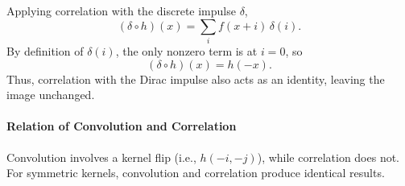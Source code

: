 Applying correlation with the discrete impulse \(\delta\),
\[
(\delta \circ h)(x) = \sum_{i} f(x+i) \, \delta(i).
\]
By definition of \(\delta(i)\), the only nonzero term is at \(i = 0\), so
\[
(\delta \circ h )(x) = h(-x).
\]
Thus, correlation with the Dirac impulse also acts as an identity, leaving the image unchanged.

\paragraph{Relation of Convolution and Correlation}
Convolution involves a kernel flip (i.e., $h(-i, -j)$), while correlation does not. For symmetric kernels, convolution and correlation produce identical results.

